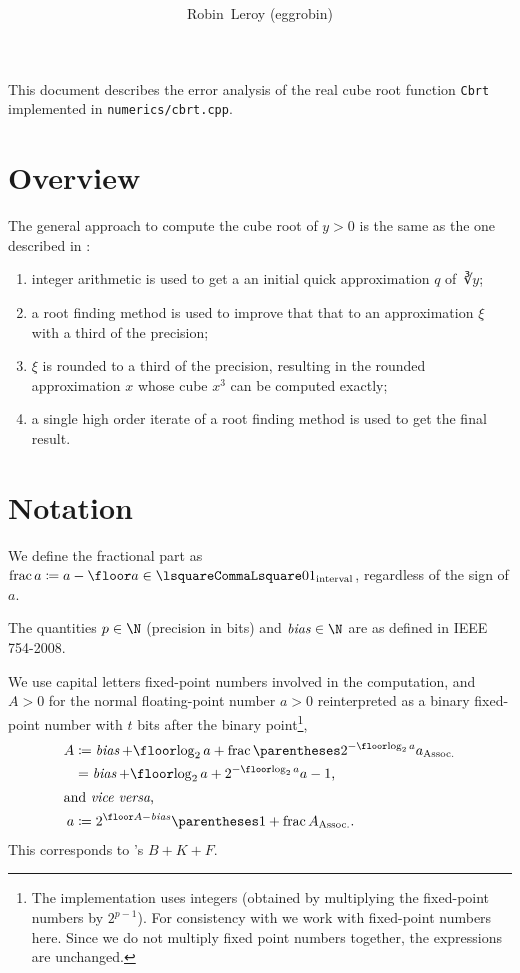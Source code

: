 ﻿\documentclass[10pt, a4paper, twoside]{basestyle}
\title{%
\textdisplay{%
A nearly correctly-rounded cube root%
}%
}
\author{Robin~Leroy (eggrobin)}
\DeclareMathOperator{\bias}{\mathit{bias}}
\begin{document}
\maketitle
\noindent
This document describes the error analysis of the real cube root function \texttt{Cbrt} implemented in \texttt{numerics/cbrt.cpp}.

\section*{Overview}
The general approach to compute the cube root of $y>0$ is the same as the one described in \cite{KahanBindel2001}:
\begin{enumerate}
\item integer arithmetic is used to get a an initial quick approximation $q$ of $\cuberoot y$;
\item a root finding method is used to improve that that to an approximation $ξ$ with a third of the precision;
\item $ξ$ is rounded to a third of the precision, resulting in the rounded approximation $x$ whose cube $x^3$ can be computed exactly;
\item a single high order iterate of a root finding method is used to get the final result.
\end{enumerate}

\section*{Notation}
We define the fractional part as $\FractionalPart a\DefineAs a-\Floor a\in\intclop{0}{1}$, regardless of the sign of $a$.

The quantities $p\in\N$ (precision in bits) and $\bias\in\N$ are as defined in IEEE 754-2008. 

We use capital letters fixed-point numbers involved in the computation, and $A>0$ for the normal floating-point number $a>0$ reinterpreted as a binary fixed-point number with $t$ bits after the binary point\footnote{The implementation uses integers (obtained by multiplying the fixed-point numbers by $2^{p-1}$). For consistency with \cite{KahanBindel2001} we work with fixed-point numbers here. Since we do not multiply fixed point numbers together, the expressions are unchanged.},\begin{align*}
  A &\DefineAs \bias + \Floor{\log_2 a} + \FractionalPart \pa{2^{-\Floor{\log_2 a}}a}\\
    &= \bias + \Floor{\log_2 a} + 2^{-\Floor{\log_2 a}}a - 1\text,\\
\intertext{and \emph{vice versa},}
  a &\DefineAs 2^{\Floor A-\bias} \pa{1+\FractionalPart{A}}\text.\\
\end{align*}
This corresponds to \cite{KahanBindel2001}'s $B+K+F$.
\end{document}
